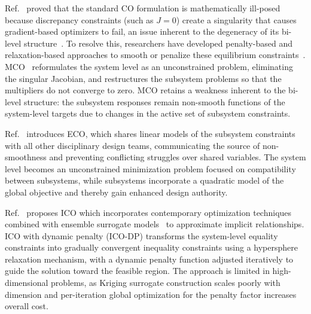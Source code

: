 Ref.~\cite{alexandrov2002} proved that the standard CO formulation is mathematically ill-posed because discrepancy constraints (such as $J = 0$) create a singularity that causes gradient-based optimizers to fail, an issue inherent to the degeneracy of its bi-level structure~\cite{luo1996,dempe2002,kim2020}. To resolve this, researchers have developed penalty-based and relaxation-based approaches to smooth or penalize these equilibrium constraints~\cite{alexandrov2002,roth2008,li2026}. MCO~\cite{alexandrov2002} reformulates the system level as an unconstrained problem, eliminating the singular Jacobian, and restructures the subsystem problems so that the multipliers do not converge to zero. MCO retains a weakness inherent to the bi-level structure: the subsystem responses remain non-smooth functions of the system-level targets due to changes in the active set of subsystem constraints.

Ref.~\cite{roth2008} introduces ECO, which shares linear models of the subsystem constraints with all other disciplinary design teams, communicating the source of non-smoothness and preventing conflicting struggles over shared variables. The system level becomes an unconstrained minimization problem focused on compatibility between subsystems, while subsystems incorporate a quadratic model of the global objective and thereby gain enhanced design authority.

Ref.~\cite{li2026} proposes ICO which incorporates contemporary optimization techniques combined with ensemble surrogate models~\cite{chen2024} to approximate implicit relationships. ICO with dynamic penalty (ICO-DP) transforms the system-level equality constraints into gradually convergent inequality constraints using a hypersphere relaxation mechanism, with a dynamic penalty function adjusted iteratively to guide the solution toward the feasible region. The approach is limited in high-dimensional problems, as Kriging surrogate construction scales poorly with dimension and per-iteration global optimization for the penalty factor increases overall cost.
